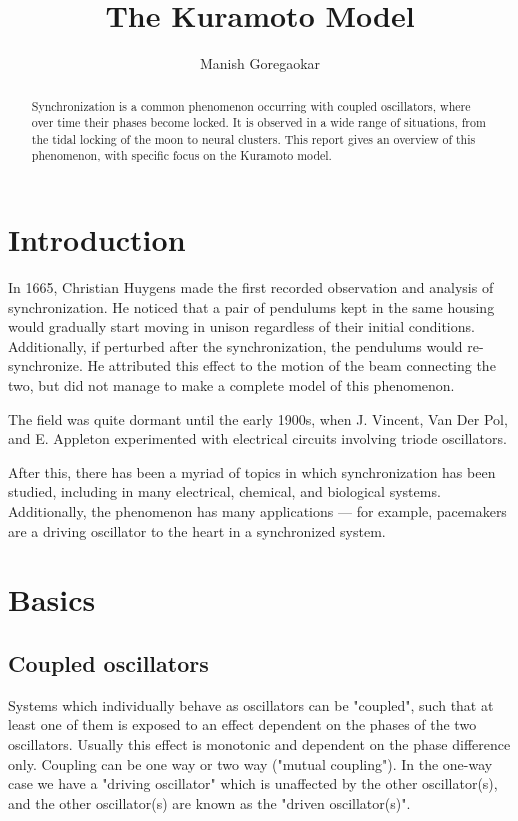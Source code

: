 \documentclass[12pt]{article}
\begin{document}
\title{The Kuramoto Model}
\author{Manish Goregaokar}

\maketitle

\begin{abstract}
Synchronization is a common phenomenon occurring with coupled oscillators, where over time their phases become locked. It is observed in a wide range of situations, from the tidal locking of the moon to neural clusters. This report gives an overview of this phenomenon, with specific focus on the Kuramoto model.
\end{abstract}
\tableofcontents
\section{Introduction}

In 1665, Christian Huygens made the first recorded observation and analysis of synchronization\cite{bennett2002huygens}. He noticed that a pair of pendulums kept in the same housing would gradually start moving in unison regardless of their initial conditions. Additionally, if perturbed after the synchronization, the pendulums would re-synchronize. He attributed this effect to the motion of the beam connecting the two, but did not manage to make a complete model of this phenomenon.

The field was quite dormant until the early 1900s, when J. Vincent\cite{vincent1919some}, Van Der Pol\cite{van1920theory}, and E. Appleton\cite{appleton1922automatic} experimented with electrical circuits involving triode oscillators.

After this, there has been a myriad of topics in which synchronization has been studied, including in many electrical, chemical, and biological systems. Additionally, the phenomenon has many applications --- for example, pacemakers are a driving oscillator to the heart in a synchronized system.

\section{Basics}
\subsection{Coupled oscillators}
Systems which individually behave as oscillators can be "coupled", such that at least one of them is exposed to an effect dependent on the phases of the two oscillators. Usually this effect is monotonic and dependent on the phase difference only. Coupling can be one way or two way ("mutual coupling"). In the one-way case we have a "driving oscillator" which is unaffected by the other oscillator(s), and the other oscillator(s) are known as the "driven oscillator(s)".
\end{document}
